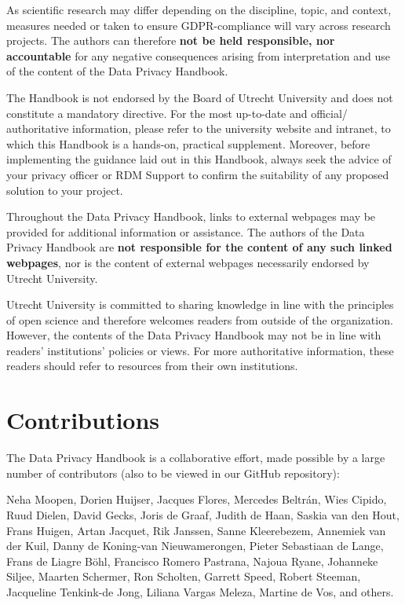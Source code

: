 \documentclass[
]{book}
\begin{document}
As scientific research may differ depending on the discipline, topic, and
context, measures needed or taken to ensure GDPR-compliance will vary across
research projects. The authors can therefore \textbf{not be held responsible, nor
accountable} for any negative consequences arising from interpretation and use
of the content of the Data Privacy Handbook.

The Handbook is not endorsed by the Board of Utrecht University and does not
constitute a mandatory directive. For the most up-to-date and official/
authoritative information, please refer to the
university
website and intranet,
to which this Handbook is a hands-on, practical supplement. Moreover, before
implementing the guidance laid out in this Handbook, always seek the advice of
your privacy officer or RDM Support to confirm the suitability of any proposed
solution to your project.

Throughout the Data Privacy Handbook, links to external webpages may be provided
for additional information or assistance. The authors of the Data Privacy
Handbook are \textbf{not responsible for the content of any such linked webpages}, nor
is the content of external webpages necessarily endorsed by Utrecht University.

Utrecht University is committed to sharing knowledge in line with the principles
of open science and therefore welcomes readers from outside of the organization.
However, the contents of the Data Privacy Handbook may not be in line with readers'
institutions' policies or views. For more authoritative information, these
readers should refer to resources from their own institutions.

\hypertarget{contributions}{%
\section{Contributions}\label{contributions}}

The Data Privacy Handbook is a collaborative effort, made possible by a large
number of contributors (also to be viewed in our
GitHub repository):

Neha Moopen, Dorien Huijser, Jacques Flores, Mercedes Beltrán, Wies Cipido,
Ruud Dielen, David Gecks, Joris de Graaf, Judith de Haan, Saskia van den Hout, Frans Huigen,
Artan Jacquet, Rik Janssen, Sanne Kleerebezem, Annemiek van der Kuil,
Danny de Koning-van Nieuwamerongen, Pieter Sebastiaan de Lange, Frans de Liagre Böhl, Francisco Romero
Pastrana, Najoua Ryane, Johanneke Siljee, Maarten Schermer, Ron Scholten,
Garrett Speed, Robert Steeman, Jacqueline Tenkink-de Jong, Liliana Vargas Meleza,
Martine de Vos, and others.
\end{document}
